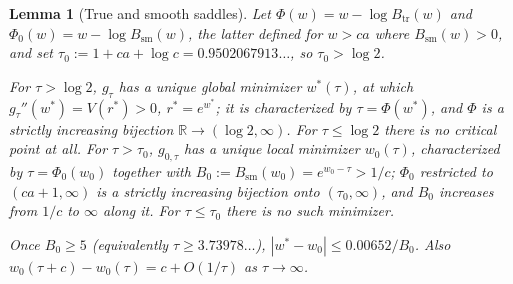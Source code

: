 \documentclass[11pt]{amsart}
\theoremstyle{plain}
\newtheorem{lemma}[theorem]{Lemma}
\theoremstyle{definition}
\theoremstyle{remark}
\newcommand{\R}{\mathbb{R}}
\begin{document}
\begin{lemma}[True and smooth saddles]
\label{lem:saddles}
Let $\Phi(w) = w-\log B_{\mathrm{tr}}(w)$ and $\Phi_0(w) = w-\log B_{\mathrm{sm}}(w)$, the latter
defined for $w>ca$ where $B_{\mathrm{sm}}(w)>0$, and set
$\tau_0 := 1+ca+\log c = 0.9502067913\ldots$, so $\tau_0 > \log 2$.

For $\tau>\log 2$, $g_\tau$ has a unique global minimizer $w^*(\tau)$, at which $g_\tau''(w^*) =
V(r^*)>0$, $r^*=e^{w^*}$; it is characterized by $\tau = \Phi(w^*)$, and $\Phi$ is a strictly
increasing bijection $\R\to(\log 2,\infty)$. For $\tau\le\log 2$ there is no critical point at
all. For $\tau>\tau_0$, $g_{0,\tau}$ has a unique local minimizer $w_0(\tau)$, characterized by
$\tau=\Phi_0(w_0)$ together with $B_0 := B_{\mathrm{sm}}(w_0) = e^{w_0-\tau} > 1/c$; $\Phi_0$
restricted to $(ca+1,\infty)$ is a strictly increasing bijection onto $(\tau_0,\infty)$, and $B_0$
increases from $1/c$ to $\infty$ along it. For $\tau\le\tau_0$ there is no such minimizer.

Once $B_0\ge5$ (equivalently $\tau\ge3.73978\ldots$), $|w^*-w_0| \le 0.00652/B_0$. Also
$w_0(\tau+c)-w_0(\tau) = c+O(1/\tau)$ as $\tau\to\infty$.
\end{lemma}
\end{document}
